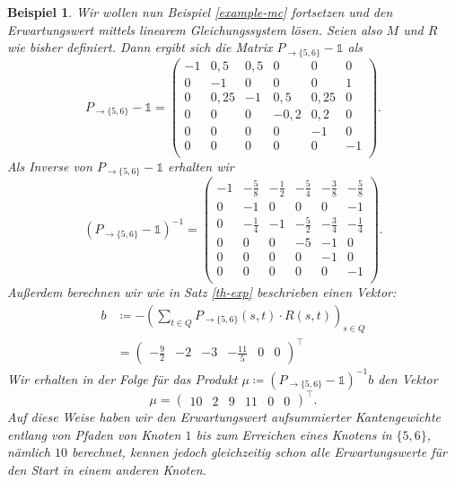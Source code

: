 \documentclass[a4paper]{article}
\newtheorem{beispiel}[satz]{Beispiel}
\theoremstyle{nonumberplain}
\begin{document}
\begin{beispiel}\label{example-mc-exp-les}
	Wir wollen nun Beispiel \ref{example-mc} fortsetzen und den Erwartungswert mittels linearem Gleichungssystem lösen. Seien also $M$ und $R$ wie bisher definiert.
	Dann ergibt sich die Matrix $P_{\rightarrow \{5,6\}} - \mathbb{1}$ als
	\begin{equation*}
		P_{\rightarrow \{5,6\}} - \mathbb{1} = \begin{pmatrix}
			-1 & 0,5 & 0,5 & 0 & 0 & 0 \\
			0 & -1 & 0 & 0 & 0 & 1 \\
			0 & 0,25 & -1 & 0,5 & 0,25 & 0 \\
			0 & 0 & 0 & -0,2 & 0,2 & 0 \\
			0 & 0 & 0 & 0 & -1 & 0 \\
			0 & 0 & 0 & 0 & 0 & -1 \\
		\end{pmatrix}\text{.}
	\end{equation*}
	Als Inverse von $P_{\rightarrow \{5,6\}} - \mathbb{1}$ erhalten wir
	\begin{equation*}
		(P_{\rightarrow \{5,6\}} - \mathbb{1})^{-1} = \begin{pmatrix}
			-1 & -\frac{5}{8} & -\frac{1}{2} & -\frac{5}{4} & -\frac{3}{8} & -\frac{5}{8} \\
			0 & -1 & 0 & 0 & 0 & -1 \\
			0 & -\frac{1}{4} & -1 & -\frac{5}{2} & -\frac{3}{4} & -\frac{1}{4} \\
			0 & 0 & 0 & -5 & -1 & 0 \\
			0 & 0 & 0 & 0 & -1 & 0 \\
			0 & 0 & 0 & 0 & 0 & -1 \\
		\end{pmatrix}\text{.}
	\end{equation*}
	Außerdem berechnen wir wie in Satz \ref{th-exp} beschrieben einen Vektor:
	\begin{align*}
		b &\coloneqq - \left(\sum_{t \in Q}{ P_{\rightarrow \{5,6\}}(s,t) \cdot R(s,t) }\right)_{s \in Q} \\
		&= \begin{pmatrix} -\frac{9}{2} & -2 & -3 & -\frac{11}{5} & 0 & 0 \end{pmatrix}^\intercal
	\end{align*}
	Wir erhalten in der Folge für das Produkt $\mu \coloneqq (P_{\rightarrow \{5,6\}} - \mathbb{1})^{-1}b$ den Vektor
	\begin{equation*}
		\mu = \begin{pmatrix} 10 & 2 & 9 & 11 & 0 & 0 \end{pmatrix}^\intercal\text{.}
	\end{equation*}
	Auf diese Weise haben wir den Erwartungswert aufsummierter Kantengewichte entlang von Pfaden von Knoten $1$ bis zum Erreichen eines Knotens in $\{5,6\}$, nämlich $10$ berechnet, kennen jedoch gleichzeitig schon alle Erwartungswerte für den Start in einem anderen Knoten.
\end{beispiel}
\end{document}
